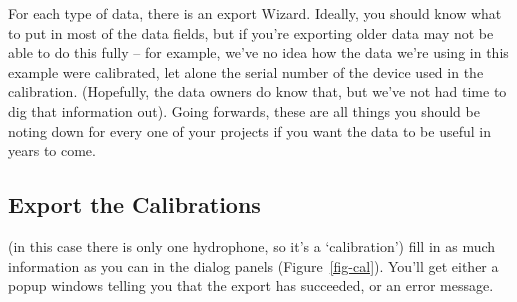 \documentclass[
]{article}
\begin{document}
For each type of data, there is an export Wizard. Ideally, you should
know what to put in most of the data fields, but if you're exporting
older data may not be able to do this fully -- for example, we've no
idea how the data we're using in this example were calibrated, let alone
the serial number of the device used in the calibration. (Hopefully, the
data owners do know that, but we've not had time to dig that information
out). Going forwards, these are all things you should be noting down for
every one of your projects if you want the data to be useful in years to
come.

\subsection{Export the Calibrations}\label{export-the-calibrations}

(in this case there is only one hydrophone, so it's a `calibration')
fill in as much information as you can in the dialog panels
(Figure~\ref{fig-cal}). You'll get either a popup windows telling you
that the export has succeeded, or an error message.
\end{document}
